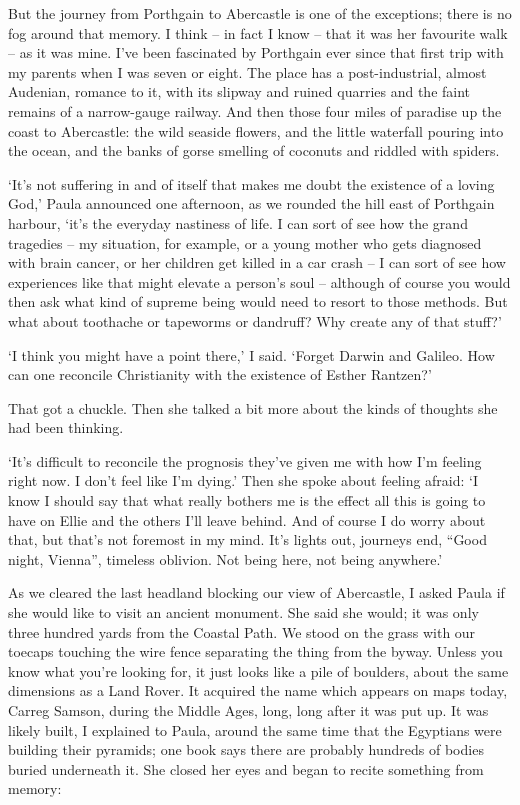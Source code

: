 But the journey from Porthgain to Abercastle is one of the exceptions; there is no fog around that memory. I think -- in fact I know -- that it was her favourite walk -- as it was mine. I've been fascinated by Porthgain ever since that first trip with my parents when I was seven or eight. The place has a post-industrial, almost Audenian, romance to it, with its slipway and ruined quarries and the faint remains of a narrow-gauge railway. And then those four miles of paradise up the coast to Abercastle: the wild seaside flowers, and the little waterfall pouring into the ocean, and the banks of gorse smelling of coconuts and riddled with spiders.

`It's not suffering in and of itself that makes me doubt the existence of a loving God,' Paula announced one afternoon, as we rounded the hill east of Porthgain harbour, `it's the everyday nastiness of life. I can sort of see how the grand tragedies -- my situation, for example, or a young mother who gets diagnosed with brain cancer, or her children get killed in a car crash -- I can sort of see how experiences like that might elevate a person's soul -- although of course you would then ask what kind of supreme being would need to resort to those methods. But what about toothache or tapeworms or dandruff? Why create any of that stuff?'

`I think you might have a point there,' I said. `Forget Darwin and Galileo. How can one reconcile Christianity with the existence of Esther Rantzen?'

That got a chuckle. Then she talked a bit more about the kinds of thoughts she had been thinking.

`It's difficult to reconcile the prognosis they've given me with how I'm feeling right now. I don't feel like I'm dying.' Then she spoke about feeling afraid: `I know I should say that what really bothers me is the effect all this is going to have on Ellie and the others I'll leave behind. And of course I do worry about that, but that's not foremost in my mind. It's lights out, journeys end, ``Good night, Vienna'', timeless oblivion. Not being here, not being anywhere.'

As we cleared the last headland blocking our view of Abercastle, I asked Paula if she would like to visit an ancient monument. She said she would; it was only three hundred yards from the Coastal Path. We stood on the grass with our toecaps touching the wire fence separating the thing from the byway. Unless you know what you're looking for, it just looks like a pile of boulders, about the same dimensions as a Land Rover. It acquired the name which appears on maps today, Carreg Samson, during the Middle Ages, long, long after it was put up. It was likely built, I explained to Paula, around the same time that the Egyptians were building their pyramids; one book says there are probably hundreds of bodies buried underneath it. She closed her eyes and began to recite something from memory:

